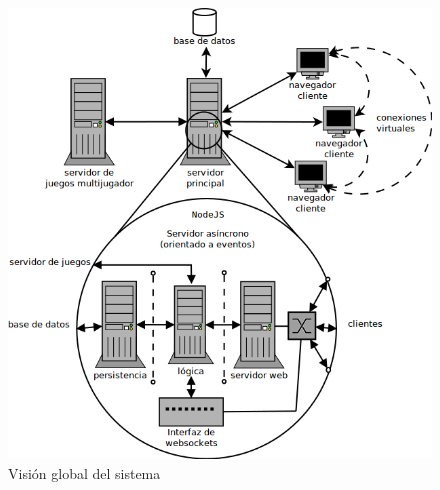 \documentclass[12pt,a4paper]{article}
\begin{document}
\begin{figure}[H]
  \begin{center}
    \includegraphics[width=\textwidth]{img/arquitectura.png}
    \caption{Visión global del sistema}
    \label{arquitectura}
  \end{center}
\end{figure}
\end{document}
